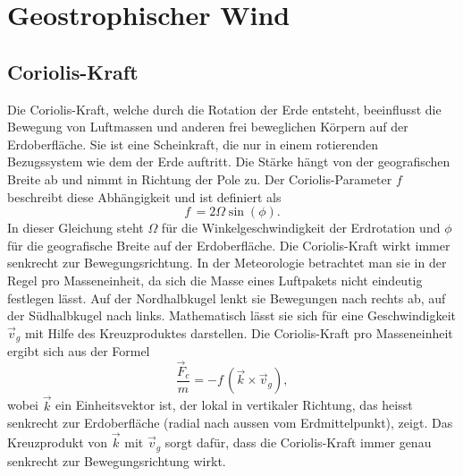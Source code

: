 %
%
%
%
\section{Geostrophischer Wind
\label{geostrophisch:section:geoWind}}


\subsection{Coriolis-Kraft
\label{geostrophisch:subsection:coriolis}}
Die Coriolis-Kraft, welche durch die Rotation der Erde entsteht, beeinflusst die Bewegung von Luftmassen und anderen frei beweglichen Körpern auf der Erdoberfläche. Sie ist eine Scheinkraft, die nur in einem rotierenden Bezugssystem wie dem der Erde auftritt. Die Stärke hängt von der geografischen Breite ab und nimmt in Richtung der Pole zu.
Der Coriolis-Parameter $f$ beschreibt diese Abhängigkeit und ist definiert als 
\begin{equation}
f\, 
= 
2\Omega\sin(\phi)
\label{geostrophisch:equation1}.
\end{equation}
In dieser Gleichung steht $\Omega$ für die Winkelgeschwindigkeit der Erdrotation und $\phi$ für die geografische Breite auf der Erdoberfläche.
Die Coriolis-Kraft wirkt immer senkrecht zur Bewegungsrichtung. In der Meteorologie betrachtet man sie in der Regel pro Masseneinheit, da sich die Masse eines Luftpakets nicht eindeutig festlegen lässt. Auf der Nordhalbkugel lenkt sie Bewegungen nach rechts ab, auf der Südhalbkugel nach links. Mathematisch lässt sie sich für eine Geschwindigkeit $\vec{v}_g $ mit Hilfe des Kreuzproduktes darstellen. 
Die Coriolis-Kraft pro Masseneinheit ergibt sich aus der Formel
\begin{equation}
\frac{\vec{F}_c} {m}
= 
-f\, (\vec{k} \times \vec{v}_g) 
\label{geostrophisch:equation2},
\end{equation}
wobei $\vec{k}$ ein Einheitsvektor ist, der lokal in vertikaler Richtung, das heisst senkrecht zur Erdoberfläche (radial nach aussen vom Erdmittelpunkt), zeigt.
Das Kreuzprodukt von $\vec{k}$ mit  $\vec{v}_g $ sorgt dafür, dass die Coriolis-Kraft immer genau senkrecht zur Bewegungsrichtung wirkt.

